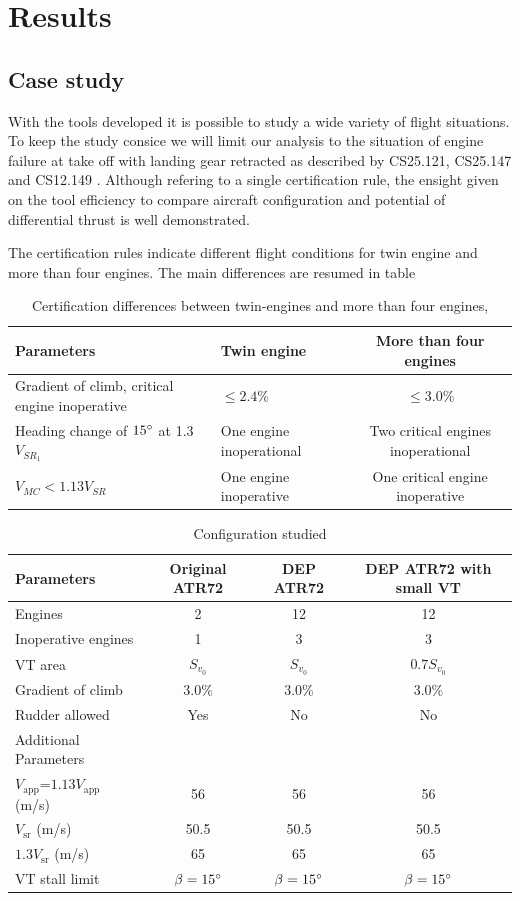 \section{Results}

\subsection{Case study}
With the tools developed it is possible to study a wide variety of flight situations. To keep the study consice we will limit our analysis to the situation of engine failure at take off with landing gear retracted as described by CS25.121, CS25.147 and CS12.149 \cite{CS25}. Although refering to a single certification rule, the ensight given on the tool efficiency to compare aircraft configuration and potential of differential thrust is well demonstrated.

The certification rules indicate different flight conditions for twin engine and more than four engines. The main differences are resumed in table %
\begin{table}[hbt]
	\caption{\label{tab:DiffTwinMulti} Certification differences between twin-engines and more than four engines, \cite{CS25}} 
	\centering
	\begin{tabular}{l|l|c}
		Parameters & Twin engine & More than four engines\\
		\hline
		Gradient of climb, critical engine inoperative & $\leq 2.4\%$ & $\leq 3.0\%$\\
		Heading change of $15\degree$ at 1.3$V_{SR_1}$& One engine inoperational & Two critical engines inoperational\\
		$V_{MC} < 1.13 V_{SR}$ & One engine inoperative & One critical engine inoperative \\
	\end{tabular}
\end{table}

\begin{table}[hbt]
	\caption{\label{tab:ConfigurationStudied} Configuration studied}
	\centering
	\begin{tabular}{l|c|c|c}
		Parameters & Original ATR72 & DEP ATR72 & DEP ATR72 with small VT\\
		\hline
		Engines & 2 & 12 & 12\\
		Inoperative engines & 1 & 3 & 3\\
		VT area & $S_{v_0}$ & $S_{v_0}$ & $0.7 S_{v_0}$\\
		Gradient of climb & $3.0\%$ & $3.0\%$ & $3.0\%$\\
		Rudder allowed & Yes & No & No\\
		\hline
		Additional Parameters & & & \\
		\hline
		$V_{\textrm{app}}$=$1.13V_{\textrm{app}}$ (m/s)& 56 & 56 & 56\\
		$V_{\textrm{sr}}$ (m/s)& 50.5 & 50.5 & 50.5\\
		$1.3V_{\textrm{sr}}$ (m/s)& 65 & 65 & 65\\
		VT stall limit & $\beta=15\degree$ & $\beta=15\degree$ & $\beta=15\degree$\\
	\end{tabular}
\end{table}

